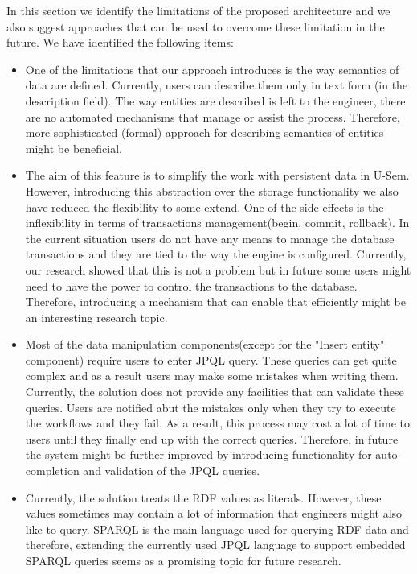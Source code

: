 In this section we identify the limitations of the proposed architecture and we also suggest approaches that can be used to overcome these limitation in the future. We have identified the following items:

\begin{itemize}
\item One of the limitations that our approach introduces is the way semantics of data are defined. Currently, users can describe them only in text form (in the description field). The way entities are described is left to the engineer, there are no automated mechanisms that manage or assist the process. Therefore, more sophisticated (formal) approach for describing semantics of entities might be beneficial.

\item The aim of this feature is to simplify the work with persistent data in U-Sem. However, introducing this abstraction over the storage functionality we also have reduced the flexibility to some extend. One of the side effects is the inflexibility in terms of transactions management(begin, commit, rollback). In the current situation users do not have any means to manage the database transactions and they are tied to the way the engine is configured. Currently, our research showed that this is not a problem but in future some users might need to have the power to control the transactions to the database. Therefore, introducing a mechanism that can enable that efficiently might be an interesting research topic.

\item Most of the data manipulation components(except for the "Insert entity" component) require users to enter JPQL query. These queries can get quite complex and as a result users may make some mistakes when writing them. Currently, the solution does not provide any facilities that can validate these queries. Users are notified abut the mistakes only when they try to execute the workflows and they fail. As a result, this process may cost a lot of time to users until they finally end up with the correct queries. Therefore, in future the system might be further improved by introducing functionality for auto-completion and validation of the JPQL queries.

\item Currently, the solution treats the RDF values as literals. However, these values sometimes may contain a lot of information that engineers might also like to query. SPARQL is the main language used for querying RDF data \cite{perez2006semantics} and therefore, extending the currently used JPQL language to support embedded SPARQL queries seems as a promising topic for future research.


\end{itemize}
